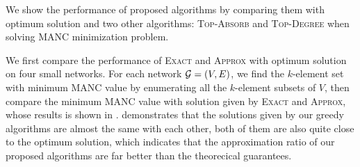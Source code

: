 \documentclass[sigconf]{acmart}
\begin{document}
We show the performance of proposed algorithms by comparing them with optimum solution and two other algorithms: \textsc{Top-Absorb} and \textsc{Top-Degree} when solving MANC minimization problem.

We first compare the performance of \textsc{Exact} and \textsc{Approx} with optimum solution on four small networks.
For each network \(\mathcal{G}=(V,E)\), we find the \(k\)-element set with minimum MANC value by enumerating all the \(k\)-element subsets of \(V\), then compare the minimum MANC value with solution given by \textsc{Exact} and \textsc{Approx}, whose results is shown in .
 demonstrates that the solutions given by our greedy algorithms are almost the same with each other, both of them are also quite close to the optimum solution, which indicates that the approximation ratio of our proposed algorithms are far better than the theorecical guarantees.

\end{document}
